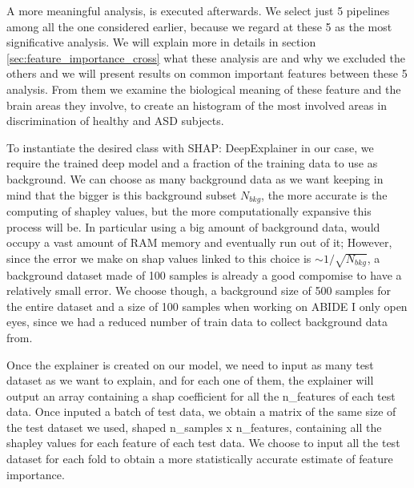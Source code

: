 \documentclass[11pt]{report}
\begin{document}
A more meaningful analysis, is executed afterwards.
We select just 5 pipelines among all the one considered earlier, because we regard at these 5 as the most significative analysis.
We will explain more in details in section \ref{sec:feature_importance_cross} what these analysis are and why we excluded the others and we will present results on common important features between these 5 analysis.
From them we examine the biological meaning of these feature and the brain areas they involve, to create an histogram of the most involved areas in discrimination of healthy and ASD subjects.

\hfill

To instantiate the desired class with SHAP: DeepExplainer in our case, we require the trained deep model and a fraction of the training data to use as background.
We can choose as many background data as we want keeping in mind that the bigger is this background subset $N_{bkg}$, the more accurate is the computing of shapley values, but the more computationally expansive this process will be.
In particular using a big amount of background data, would occupy a vast amount of RAM memory and eventually run out of it;
However, since the error we make on shap values linked to this choice is $\sim 1/\sqrt{N_{bkg}}$, a background dataset made of 100 samples is already a good compomise to have a relatively small error.
We choose though, a background size of 500 samples for the entire dataset and a size of 100 samples when working on ABIDE I only open eyes, since we had a reduced number of train data to collect background data from.

Once the explainer is created on our model, we need to input as many test dataset as we want to explain, and for each one of them, the explainer will output an array containing a shap coefficient for all the n\_features of each test data.
Once inputed a batch of test data, we obtain a matrix of the same size of the test dataset we used, shaped n\_samples x n\_features, containing all the shapley values for each feature of each test data.
We choose to input all the test dataset for each fold to obtain a more statistically accurate estimate of feature importance.
\end{document}
